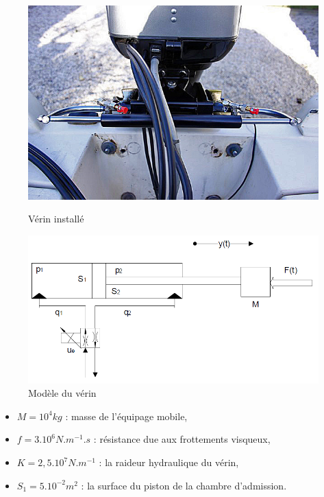 \begin{figure}[htbp]
\begin{minipage}[c]{.48\linewidth}
\begin{center}
\includegraphics[width=0.8\linewidth]{img/verin.png}
\caption{Vérin installé}
\label{fig:image10}
\end{center}
\end{minipage}
\hfill
\begin{minipage}[c]{.50\linewidth}
\begin{center}
\includegraphics[width=\linewidth]{img/verin2.png}
\caption{Modèle du vérin}
\label{fig:image11}
\end{center}
\end{minipage}
\end{figure}

\begin{itemize}
 \item $M = 10^4 kg$ : masse de l'équipage mobile,
 \item $f = 3.10^6 N.m^{-1}.s$ : résistance due aux frottements visqueux,
 \item $K = 2,5.10^7 N.m^{-1}$ : la raideur hydraulique du vérin, 
 \item $S_1 = 5.10^{-2} m^2$ : la surface du piston de la chambre d'admission.
\end{itemize}


